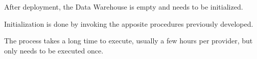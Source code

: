 After deployment, the Data Warehouse is empty and needs to be initialized.

Initialization is done by invoking the apposite procedures previously developed.

The process takes a long time to execute, usually a few hours per provider, but only needs to be executed once.


